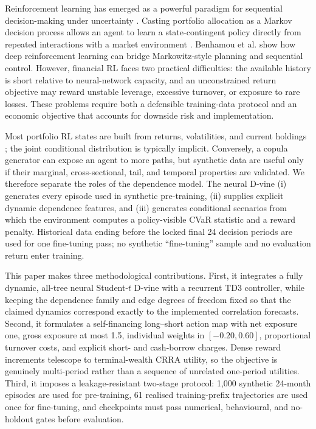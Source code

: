 Reinforcement learning has emerged as a powerful paradigm for sequential decision-making under uncertainty \cite{sutton_reinforcement_2018}. Casting portfolio allocation as a Markov decision process allows an agent to learn a state-contingent policy directly from repeated interactions with a market environment \cite{jang_deep_2023,jiang_deep_2017}. Benhamou et al. \cite{benhamou_bridging_2020} show how deep reinforcement learning can bridge Markowitz-style planning and sequential control. However, financial RL faces two practical difficulties: the available history is short relative to neural-network capacity, and an unconstrained return objective may reward unstable leverage, excessive turnover, or exposure to rare losses. These problems require both a defensible training-data protocol and an economic objective that accounts for downside risk and implementation.

Most portfolio RL states are built from returns, volatilities, and current holdings \cite{jiang_deep_2017,yu_model-based_2020}; the joint conditional distribution is typically implicit. Conversely, a copula generator can expose an agent to more paths, but synthetic data are useful only if their marginal, cross-sectional, tail, and temporal properties are validated. We therefore separate the roles of the dependence model. The neural D-vine (i) generates every episode used in synthetic pre-training, (ii) supplies explicit dynamic dependence features, and (iii) generates conditional scenarios from which the environment computes a policy-visible CVaR statistic and a reward penalty. Historical data ending before the locked final 24 decision periods are used for one fine-tuning pass; no synthetic ``fine-tuning'' sample and no evaluation return enter training.

This paper makes three methodological contributions. First, it integrates a fully dynamic, all-tree neural Student-$t$ D-vine with a recurrent TD3 controller, while keeping the dependence family and edge degrees of freedom fixed so that the claimed dynamics correspond exactly to the implemented correlation forecasts. Second, it formulates a self-financing long--short action map with net exposure one, gross exposure at most 1.5, individual weights in $[-0.20,0.60]$, proportional turnover costs, and explicit short- and cash-borrow charges. Dense reward increments telescope to terminal-wealth CRRA utility, so the objective is genuinely multi-period rather than a sequence of unrelated one-period utilities. Third, it imposes a leakage-resistant two-stage protocol: 1,000 synthetic 24-month episodes are used for pre-training, 61 realised training-prefix trajectories are used once for fine-tuning, and checkpoints must pass numerical, behavioural, and no-holdout gates before evaluation.

